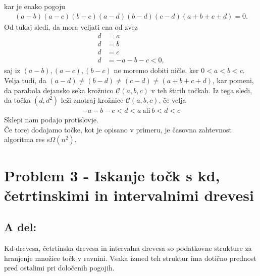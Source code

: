 \documentclass[a4paper,11pt]{article}
\begin{document}
kar je enako pogoju
\begin{align*}
    (a - b)(a - c)(b - c)(a - d)(b - d)(c - d)(a + b + c + d) = 0.
\end{align*}
Od tukaj sledi, da mora veljati ena od zvez
\begin{align*}
    d &= a \\
    d &= b \\
    d &= c \\
    d &= - a - b - c < 0,
\end{align*}
saj iz $(a - b), (a - c), (b - c)$ ne moremo dobiti ničle, ker $0 < a < b < c$.
Velja tudi, da $(a - d) \neq (b - d) \neq (c - d) \neq (a + b + c + d)$, kar pomeni, da parabola dejansko seka krožnico $\mathcal{C}(a, b, c)$ v teh štirih točkah. 
Iz tega sledi, da točka $(d, d^2)$ leži znotraj krožnice $\mathcal{C}(a, b, c)$, če velja
\begin{align*}
    - a - b - c < d < a  \ 
    \text{ali}
    \ 
    b < d < c
\end{align*}    
Sklepi nam podajo protislovje.
\\
Če torej dodajamo točke, kot je opisano v primeru, je časovna zahtevnost algoritma res s$\Omega(n^2)$.

\section*{Problem 3 - Iskanje točk s kd, četrtinskimi in intervalnimi drevesi}

\subsection*{A del:}
Kd-drevesa, četrtinska drevesa in intervalna drevesa so podatkovne strukture za hranjenje množice točk v ravnini. 
Vsaka izmed teh struktur ima dotično prednost pred ostalimi pri določenih pogojih.
\end{document}
